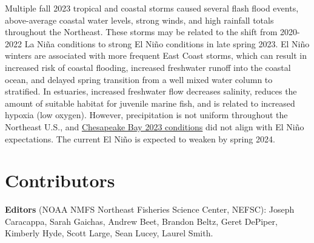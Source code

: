 \documentclass[
  10pt,
]{article}
\begin{document}
Multiple fall 2023 tropical and coastal storms caused several flash flood events, above-average coastal water levels, strong winds, and high rainfall totals throughout the Northeast. These storms may be related to the shift from 2020-2022 La Niña conditions to strong El Niño conditions in late spring 2023. El Niño winters are associated with more frequent East Coast storms, which can result in increased risk of coastal flooding, increased freshwater runoff into the coastal ocean, and delayed spring transition from a well mixed water column to stratified. In estuaries, increased freshwater flow decreases salinity, reduces the amount of suitable habitat for juvenile marine fish, and is related to increased hypoxia (low oxygen). However, precipitation is not uniform throughout the Northeast U.S., and \href{https://noaa-edab.github.io/catalog/chesapeake-bay-salinity.html}{Chesapeake Bay 2023 conditions} did not align with El Niño expectations. The current El Niño is expected to weaken by spring 2024.

\hypertarget{contributors}{%
\section{Contributors}\label{contributors}}

\textbf{Editors} (NOAA NMFS Northeast Fisheries Science Center, NEFSC): Joseph Caracappa, Sarah Gaichas, Andrew Beet, Brandon Beltz, Geret DePiper, Kimberly Hyde, Scott Large, Sean Lucey, Laurel Smith.
\end{document}
